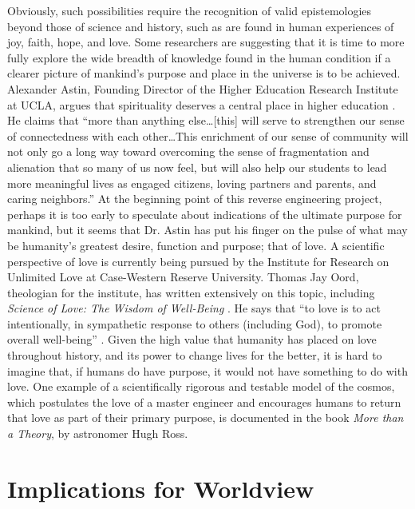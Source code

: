 Obviously, such possibilities require the recognition of valid
epistemologies beyond those of science and history, such as are found
in human experiences of joy, faith, hope, and love. Some researchers
are suggesting that it is time to more fully explore the wide breadth of
knowledge found in the human condition if a clearer picture of
mankind’s purpose and place in the universe is to be achieved.
Alexander Astin, Founding Director of the Higher Education Research
Institute at UCLA, argues that spirituality deserves a central place in
higher education \citep{astin2004}. He claims that ``more than
anything else{\ldots}[this] will serve to strengthen our sense of
connectedness with each other{\ldots}This enrichment of our sense of community
will not only go a long way toward overcoming the sense of
fragmentation and alienation that so many of us now feel, but will also
help our students to lead more meaningful lives as engaged citizens,
loving partners and parents, and caring neighbors.'' At the beginning
point of this reverse engineering project, perhaps it is too early to
speculate about indications of the ultimate purpose for mankind, but it
seems that Dr. Astin has put his finger on the pulse of what may be
humanity’s greatest desire, function and purpose; that of love. A
scientific perspective of love is currently being pursued by the
Institute for Research on Unlimited Love at Case-Western Reserve
University. Thomas Jay Oord, theologian for the institute, has written
extensively on this topic, including \textit{Science of Love: The
Wisdom of Well-Being} \citep{oord2004}. He says that
“to love is to act intentionally, in
sympathetic response to others (including God), to promote overall
well-being” \citep[][p.~75]{oord2004}. Given the high value that humanity has placed on love
throughout history, and its power to change lives for the better, it is
hard to imagine that, if humans do have purpose, it would not have
something to do with love. One example of a scientifically rigorous and
testable model of the cosmos, which postulates the love of a master
engineer and encourages humans to return that love as part of their
primary purpose, is documented in the book
\textit{More than a Theory},\citep{ross2009}
by astronomer Hugh Ross.

\section{Implications for Worldview}

